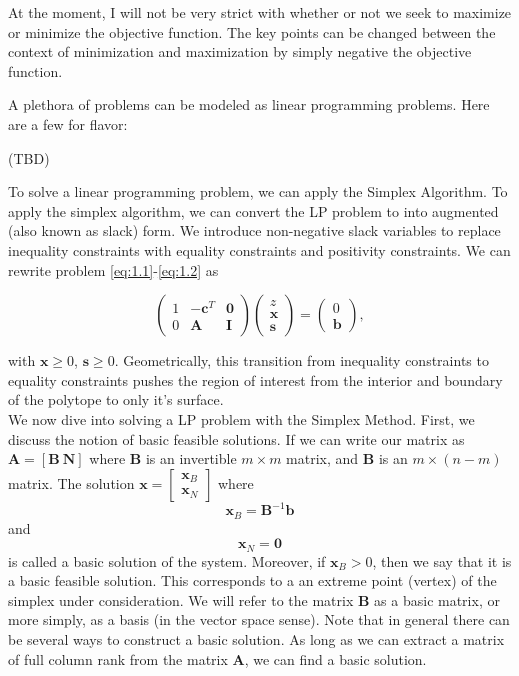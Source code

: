 \documentclass[12pt,english]{article}
\begin{document}
At the moment, I will not be very strict with whether or not we seek to maximize or minimize the objective function.  The key points can be changed between the context of minimization and maximization by simply negative the objective function.

A plethora of problems can be modeled as linear programming problems.  Here are a few for flavor:

(TBD)

To solve a linear programming problem, we can apply the Simplex Algorithm.   To apply the simplex algorithm, we can convert the LP problem to into augmented (also known as slack) form.  We introduce non-negative slack variables to replace inequality constraints with equality constraints and positivity constraints.   We can rewrite problem \eqref{eq:1.1}-\eqref{eq:1.2} as

\begin{equation}
\left(
\begin{array}{ccc}
1	&	-\mathbf{c}^T 	&	\mathbf{0} 	\\
0	&	\mathbf{A}		& 	\mathbf{I}
\end{array}
\right)
\left(
\begin{array}{c}
z \\
\mathbf{x} \\
\mathbf{s}
\end{array}
\right)
= 
\left(
\begin{array}{c}
0 \\
\mathbf{b}
\end{array}
\right),
\end{equation}

with $\mathbf{x} \geq 0$, $\mathbf{s} \geq 0$.  Geometrically, this transition from inequality constraints to equality constraints pushes the region of interest from the interior and boundary of the polytope to only it's surface.\\

We now dive into solving a LP problem with the Simplex Method.   First, we discuss the notion of basic feasible solutions.   If we can write our matrix as $\mathbf{A} = [\mathbf{B}~ \mathbf{N}]$ where $\mathbf{B}$ is an invertible $m \times m$ matrix, and $\mathbf{B}$ is an $m \times (n-m)$ matrix.  The solution $\mathbf{x} = \left[\begin{array}{c} \mathbf{x}_B \\ \mathbf{x}_N \end{array}\right]$ where 
$$
\mathbf{x}_B = \mathbf{B}^{-1} \mathbf{b}
$$
and
$$
\mathbf{x}_N = \mathbf{0}
$$
is called a basic solution of the system.  Moreover, if $\mathbf{x}_B >0$, then we say that it is a basic feasible solution.  This corresponds to a an extreme point (vertex) of the simplex under consideration.  We will refer to the matrix $\mathbf{B}$ as a basic matrix, or more simply, as a basis (in the vector space sense).  Note that in general there can be several ways to construct a basic solution.  As long as we can extract a matrix of full column rank from the matrix $\mathbf{A}$, we can find a basic solution.   \\
\end{document}
